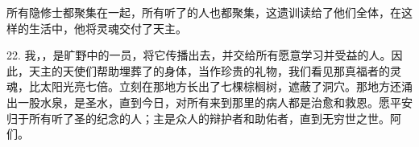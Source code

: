 所有隐修士都聚集在一起，所有听了的人也都聚集，这遗训读给了他们全体，在这样的生活中，他将灵魂交付了天主。\par

22. 我，，是旷野中的一员，将它传播出去，并交给所有愿意学习并受益的人。因此，天主的天使们帮助埋葬了的身体，当作珍贵的礼物，我们看见那真福者的灵魂，比太阳光亮七倍。立刻在那地方长出了七棵棕榈树，遮蔽了洞穴。那地方还涌出一股水泉，是圣水，直到今日，对所有来到那里的病人都是治愈和救恩。愿平安归于所有听了圣的纪念的人；主是众人的辩护者和助佑者，直到无穷世之世。阿们。\par

